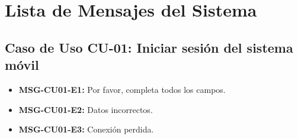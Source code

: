 
\newpage


\newpage


\newpage


\newpage

%
\newpage


\newpage


\newpage


\newpage


\newpage


\newpage


\newpage


\newpage


\newpage


\newpage


\newpage


\newpage


\newpage


\newpage


\newpage


\newpage


\newpage


\newpage


\newpage


\newpage

\section{Lista de Mensajes del Sistema}

\subsection{Caso de Uso CU-01: Iniciar sesión del sistema móvil}
\begin{itemize}
	\item \textbf{\label{msg:CU01-E1}MSG-CU01-E1:} Por favor, completa todos los campos.
	\item \textbf{\label{msg:CU01-E2}MSG-CU01-E2:} Datos incorrectos.
	\item \textbf{\label{msg:CU01-E3}MSG-CU01-E3:} Conexión perdida.
\end{itemize}

